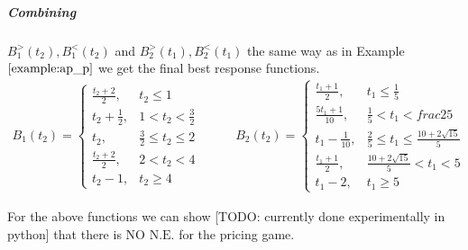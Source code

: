 \documentclass[10pt,a4paper]{book}
\newcommand{\NE}{\mathrm{N.E.}}
\theoremstyle{definition}
\theoremstyle{comment}
\begin{document}
\subparagraph{Combining} $B_1^>(t_2), B_1^<(t_2)$ and $B_2^>(t_1), B_2^<(t_1)$ the same way as in Example $\ref{example:ap_p}$ we get the final best response functions.
\begin{equation*}
	\begin{aligned}
		B_1(t_2) =
		\begin{cases}
			\frac{t_2 + 2}2, & t_2 \le 1 \\
			t_2 + \frac12, & 1 < t_2 < \frac32 \\
			t_2, & \frac32 \le t_2 \le 2 \\
			\frac{t_2 + 2}2, & 2 < t_2 < 4 \\
			t_2 - 1, & t_2 \ge 4
		\end{cases}
	\end{aligned}
	\qquad
	\begin{aligned}
		B_2(t_2) =
		\begin{cases}
			\frac{t_1 + 1}2, & t_1 \le \frac15 \\
			\frac{5 t_1 + 1}{10}, & \frac15 < t_1 < frac25 \\
			t_1 - \frac1{10}, & \frac25 \le t_1 \le \frac{10 + 2 \sqrt{15}}5 \\
			\frac{t_1 + 1}2, & \frac{10 + 2 \sqrt{15}}5 < t_1 < 5 \\
			t_1 - 2, & t_1 \ge 5
		\end{cases}
	\end{aligned}
\end{equation*}

For the above functions we can show [TODO: currently done experimentally in python] that there is NO $\NE$ for the pricing game.
\end{document}
